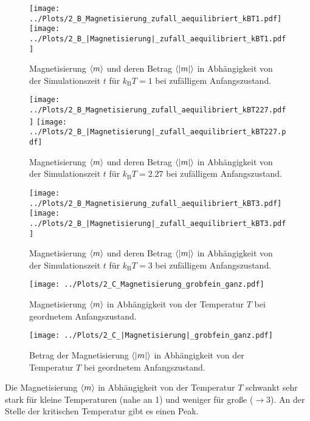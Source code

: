 \begin{figure}[H]
\centering
\texttt{[image: ../Plots/2\_B\_Magnetisierung\_zufall\_aequilibriert\_kBT1.pdf]}
\texttt{[image: ../Plots/2\_B\_|Magnetisierung|\_zufall\_aequilibriert\_kBT1.pdf]}
\caption{Magnetisierung $\braket{m}$ und deren Betrag $\braket{|m|}$ in Abhängigkeit von der Simulationszeit $t$ für $k_\text{B}T=1$ bei zufälligem Anfangszustand.}
\label{fig:magnetisierung_zufall_kBT1}
\end{figure}

\begin{figure}[H]
\texttt{[image: ../Plots/2\_B\_Magnetisierung\_zufall\_aequilibriert\_kBT227.pdf]}
\texttt{[image: ../Plots/2\_B\_|Magnetisierung|\_zufall\_aequilibriert\_kBT227.pdf]}
\caption{Magnetisierung $\braket{m}$ und deren Betrag $\braket{|m|}$ in Abhängigkeit von der Simulationszeit $t$ für $k_\text{B}T=\num{2,27}$ bei zufälligem Anfangszustand.}
\label{fig:magnetisierung_zufall_kBT227}
\end{figure}

\begin{figure}[H]
\texttt{[image: ../Plots/2\_B\_Magnetisierung\_zufall\_aequilibriert\_kBT3.pdf]}
\texttt{[image: ../Plots/2\_B\_|Magnetisierung|\_zufall\_aequilibriert\_kBT3.pdf]}
\caption{Magnetisierung $\braket{m}$ und deren Betrag $\braket{|m|}$ in Abhängigkeit von der Simulationszeit $t$ für $k_\text{B}T=3$ bei zufälligem Anfangszustand.}
\label{fig:magnetisierung_zufall_kBT3}
\end{figure}

\begin{figure}[H]
\centering
\texttt{[image: ../Plots/2\_C\_Magnetisierung\_grobfein\_ganz.pdf]}
\caption{Magnetisierung $\braket{m}$ in Abhängigkeit von der Temperatur $T$ bei geordnetem Anfangszustand.}
\label{fig:magnetisierung}
\end{figure}

\begin{figure}[H]
\centering
\texttt{[image: ../Plots/2\_C\_|Magnetisierung|\_grobfein\_ganz.pdf]}
\caption{Betrag der Magnetisierung $\braket{|m|}$ in Abhängigkeit von der Temperatur $T$ bei geordnetem Anfangszustand.}
\label{fig:|magnetisierung|}
\end{figure}

Die Magnetisierung $\braket{m}$ in Abhängigkeit von der Temperatur $T$ schwankt sehr stark für kleine Temperaturen (nahe an 1) und weniger für große ($\rightarrow3$).
An der Stelle der kritischen Temperatur gibt es einen Peak.

